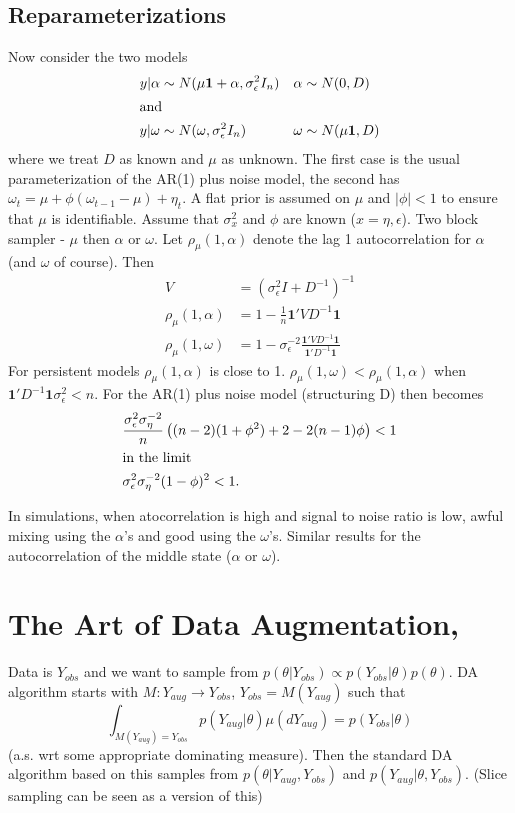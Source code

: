 \documentclass{article}\usepackage[]{graphicx}\usepackage[]{color}
\begin{document}
\subsection{Reparameterizations}
Now consider the two models
\begin{align*}
  y|\alpha &\sim N(\mu\bm{1} + \alpha, \sigma^2_\epsilon I_n) && \alpha \sim N(0,D)\\
  \intertext{and}
  y|\omega &\sim N(\omega, \sigma^2_\epsilon I_n) && \omega \sim N(\mu\bm{1}, D)
\end{align*}
where we treat $D$ as known and $\mu$ as unknown. The first case is the usual parameterization of the AR(1) plus noise model, the second has $\omega_t = \mu + \phi(\omega_{t-1} - \mu) + \eta_t$. A flat prior is assumed on $\mu$ and $|\phi|<1$ to ensure that $\mu$ is identifiable. Assume that $\sigma_x^2$ and $\phi$ are known ($x=\eta,\epsilon$). Two block sampler - $\mu$ then $\alpha$ or $\omega$. Let $\rho_\mu(1,\alpha)$ denote the lag 1 autocorrelation for $\alpha$ (and $\omega$ of course). Then
\begin{align*}
  V & = (\sigma_\epsilon^2I + D^{-1})^{-1}\\
  \rho_\mu(1,\alpha) & = 1 - \frac{1}{n}\bm{1}'VD^{-1}\bm{1}\\
  \rho_{\mu}(1, \omega) & = 1 - \sigma_\epsilon^{-2}\frac{\bm{1}'VD^{-1}\bm{1}}{\bm{1}'D^{-1}\bm{1}}
\end{align*}
For persistent models $\rho_{\mu}(1,\alpha)$ is close to 1. $\rho_\mu(1,\omega) < \rho_\mu(1,\alpha)$ when $\bm{1}'D^{-1}\bm{1}\sigma_\epsilon^2 < n$. For the AR(1) plus noise model (structuring D) then becomes
\begin{align*}
  &\frac{\sigma_\epsilon^2\sigma_\eta^{-2}}{n}\left((n-2)(1+\phi^2) + 2 - 2(n-1)\phi\right) < 1\\
  \intertext{in the limit}
  &\sigma_\epsilon^2\sigma_\eta^{-2}(1-\phi)^2 < 1.
\end{align*}

In simulations, when atocorrelation is high and signal to noise ratio is low, awful mixing using the $\alpha$'s and good using the $\omega$'s. Similar results for the autocorrelation of the middle state ($\alpha$ or $\omega$).

\section{The Art of Data Augmentation, \citet{van2001art}}
Data is $Y_{obs}$ and we want to sample from $p(\theta|Y_{obs})\propto p(Y_{obs}|\theta)p(\theta)$. DA algorithm starts with $M:Y_{aug}\to Y_{obs}$, $Y_{obs}=M(Y_{aug})$ such that
\[
\int_{M(Y_{aug})=Y_{obs}} p(Y_{aug}|\theta)\mu(dY_{aug}) = p(Y_{obs}|\theta)
\]
(a.s. wrt some appropriate dominating measure). Then the standard DA algorithm based on this samples from $p(\theta|Y_{aug},Y_{obs})$ and $p(Y_{aug}|\theta,Y_{obs})$. (Slice sampling can be seen as a version of this)
\end{document}
